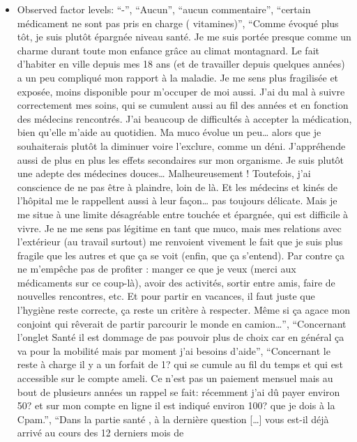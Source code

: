 \documentclass[
  letterpaper,
  DIV=11,
  numbers=noendperiod]{scrartcl}
\providecommand{\tightlist}{%
  \setlength{\itemsep}{0pt}\setlength{\parskip}{0pt}}
\begin{document}
\begin{itemize}
\tightlist
\item
  Observed factor levels: ``-'', ``Aucun'', ``aucun commentaire'',
  ``certain médicament ne sont pas pris en charge ( vitamines)'',
  ``Comme évoqué plus tôt, je suis plutôt épargnée niveau santé. Je me
  suis portée presque comme un charme durant toute mon enfance grâce au
  climat montagnard. Le fait d'habiter en ville depuis mes 18 ans (et de
  travailler depuis quelques années) a un peu compliqué mon rapport à la
  maladie. Je me sens plus fragilisée et exposée, moins disponible pour
  m'occuper de moi aussi. J'ai du mal à suivre correctement mes soins,
  qui se cumulent aussi au fil des années et en fonction des médecins
  rencontrés. J'ai beaucoup de difficultés à accepter la médication,
  bien qu'elle m'aide au quotidien. Ma muco évolue un peu\ldots{} alors
  que je souhaiterais plutôt la diminuer voire l'exclure, comme un déni.
  J'appréhende aussi de plus en plus les effets secondaires sur mon
  organisme. Je suis plutôt une adepte des médecines douces\ldots{}
  Malheureusement ! Toutefois, j'ai conscience de ne pas être à
  plaindre, loin de là. Et les médecins et kinés de l'hôpital me le
  rappellent aussi à leur façon\ldots{} pas toujours délicate. Mais je
  me situe à une limite désagréable entre touchée et épargnée, qui est
  difficile à vivre. Je ne me sens pas légitime en tant que muco, mais
  mes relations avec l'extérieur (au travail surtout) me renvoient
  vivement le fait que je suis plus fragile que les autres et que ça se
  voit (enfin, que ça s'entend). Par contre ça ne m'empêche pas de
  profiter : manger ce que je veux (merci aux médicaments sur ce
  coup-là), avoir des activités, sortir entre amis, faire de nouvelles
  rencontres, etc. Et pour partir en vacances, il faut juste que
  l'hygiène reste correcte, ça reste un critère à respecter. Même si ça
  agace mon conjoint qui rêverait de partir parcourir le monde en
  camion\ldots{}'', ``Concernant l'onglet Santé il est dommage de pas
  pouvoir plus de choix car en général ça va pour la mobilité mais par
  moment j'ai besoins d'aide'', ``Concernant le reste à charge il y a un
  forfait de 1? qui se cumule au fil du temps et qui est accessible sur
  le compte ameli. Ce n'est pas un paiement mensuel mais au bout de
  plusieurs années un rappel se fait: récemment j'ai dû payer environ
  50? et sur mon compte en ligne il est indiqué environ 100? que je dois
  à la Cpam.'', ``Dans la partie santé , à la dernière question
  {[}\ldots{]} vous est-il déjà arrivé au cours des 12 derniers mois de

\end{itemize}
\end{document}
